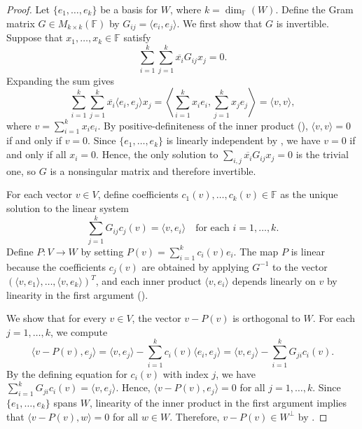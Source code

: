 \begin{proof}
    Let $\{e_1, \dots, e_k\}$ be a basis for $W$, where $k = \dim_{\mathbb{F}}(W)$. Define the Gram matrix $G \in M_{k \times k}(\mathbb{F})$ by $G_{ij} = \langle e_i, e_j \rangle$. We first show that $G$ is invertible. Suppose that $x_1, \dots, x_k \in \mathbb{F}$ satisfy
    $$\sum_{i=1}^k \sum_{j=1}^k \overline{x_i} G_{ij} x_j = 0.$$
    Expanding the sum gives
    $$\sum_{i=1}^k \sum_{j=1}^k \overline{x_i} \langle e_i, e_j \rangle x_j = \left\langle \sum_{i=1}^k x_i e_i, \sum_{j=1}^k x_j e_j \right\rangle = \langle v, v \rangle,$$
    where $v = \sum_{i=1}^k x_i e_i$. By positive-definiteness of the inner product (), $\langle v, v \rangle = 0$ if and only if $v = 0$. Since $\{e_1, \dots, e_k\}$ is linearly independent by , we have $v = 0$ if and only if all $x_i = 0$. Hence, the only solution to $\sum_{i,j} \overline{x_i} G_{ij} x_j = 0$ is the trivial one, so $G$ is a nonsingular matrix and therefore invertible.

    For each vector $v \in V$, define coefficients $c_1(v), \dots, c_k(v) \in \mathbb{F}$ as the unique solution to the linear system
    $$\sum_{j=1}^k G_{ij} c_j(v) = \langle v, e_i \rangle \quad \text{for each } i = 1, \dots, k.$$
    Define $P: V \to W$ by setting $P(v) = \sum_{i=1}^k c_i(v) e_i$. The map $P$ is linear because the coefficients $c_j(v)$ are obtained by applying $G^{-1}$ to the vector $(\langle v, e_1 \rangle, \dots, \langle v, e_k \rangle)^T$, and each inner product $\langle v, e_i \rangle$ depends linearly on $v$ by linearity in the first argument ().

    We show that for every $v \in V$, the vector $v - P(v)$ is orthogonal to $W$. For each $j = 1, \dots, k$, we compute
    $$\langle v - P(v), e_j \rangle = \langle v, e_j \rangle - \sum_{i=1}^k c_i(v) \langle e_i, e_j \rangle = \langle v, e_j \rangle - \sum_{i=1}^k G_{ji} c_i(v).$$
    By the defining equation for $c_i(v)$ with index $j$, we have $\sum_{i=1}^k G_{ji} c_i(v) = \langle v, e_j \rangle$. Hence, $\langle v - P(v), e_j \rangle = 0$ for all $j = 1, \dots, k$. Since $\{e_1, \dots, e_k\}$ spans $W$, linearity of the inner product in the first argument implies that $\langle v - P(v), w \rangle = 0$ for all $w \in W$. Therefore, $v - P(v) \in W^{\perp}$ by .


\end{proof}

